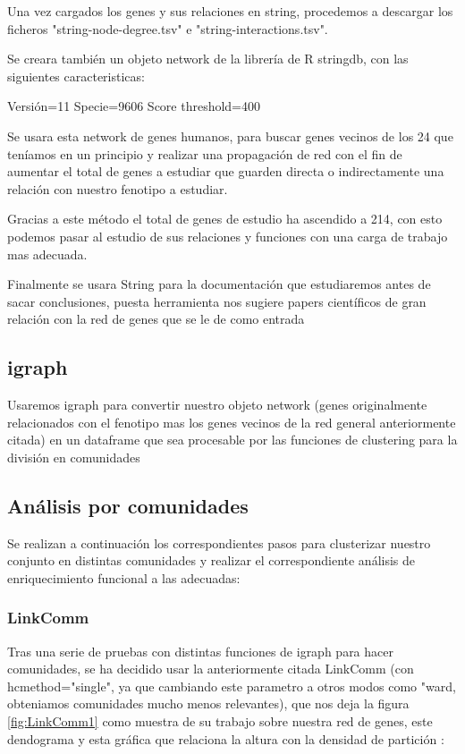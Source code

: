 Una vez cargados los genes y sus relaciones en string, procedemos a descargar los ficheros "string-node-degree.tsv" e "string-interactions.tsv".

Se creara también un objeto network de la librería de R stringdb, con las siguientes caracteristicas:

Versión=11
Specie=9606
Score threshold=400

\hfill

Se usara esta network de genes humanos, para buscar genes vecinos de los 24 que teníamos en un principio y realizar una propagación de red con el fin de aumentar el total de genes a estudiar que guarden directa o indirectamente una relación con nuestro fenotipo a estudiar.

\hfill

Gracias a este método el total de genes de estudio ha ascendido a 214, con esto podemos pasar al estudio de sus relaciones y funciones con una carga de trabajo mas adecuada.

Finalmente se usara String para la documentación que estudiaremos antes de sacar conclusiones, puesta herramienta nos sugiere papers científicos de gran relación con la red de genes que se le de como entrada

\subsection{igraph}

Usaremos igraph para convertir nuestro objeto network (genes originalmente relacionados con el  fenotipo mas los genes vecinos de la red general anteriormente citada) en un dataframe que sea procesable por las funciones de clustering para la división en comunidades

\hfill

\subsection{Análisis por comunidades}

Se realizan a continuación los correspondientes pasos para clusterizar nuestro conjunto en distintas comunidades y realizar el correspondiente análisis de enriquecimiento funcional a las adecuadas:

\subsubsection{LinkComm}

Tras una serie de pruebas con distintas funciones de igraph para hacer comunidades, se ha decidido usar la anteriormente citada LinkComm (con hcmethod="single", ya que cambiando este parametro a otros modos como "ward, obteniamos comunidades mucho menos relevantes), que nos deja la figura \ref{fig:LinkComm1} como muestra de su trabajo sobre nuestra red de genes, este dendograma y esta gráfica que relaciona la altura con la densidad de partición :

